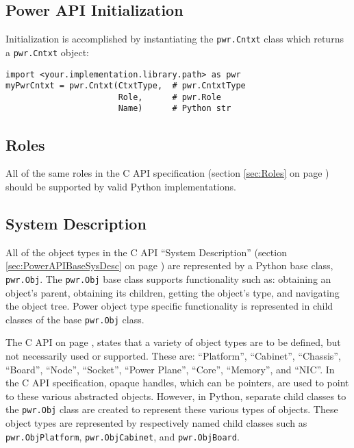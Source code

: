 \documentclass[12pt]{report} %
\begin{document}
\begin{appendices}
\subsection{Power API Initialization}\label{sec:PythonPowerAPIInitialization}
Initialization is accomplished by instantiating the \texttt{pwr.Cntxt} class
which returns a \texttt{pwr.Cntxt} object:

\begin{center}\begin{minipage}{.95\linewidth}\begin{lstlisting}
import <your.implementation.library.path> as pwr
myPwrCntxt = pwr.Cntxt(CtxtType,  # pwr.CntxtType
                       Role,      # pwr.Role
                       Name)      # Python str
\end{lstlisting}\end{minipage}\end{center}

\subsection{Roles}\label{sec:PythonRoles}
All of the same roles in the C API specification (section \ref{sec:Roles} on
page \pageref{sec:Roles}) should be supported by valid Python implementations.

\subsection{System Description}\label{sec:PythonSystemDescription}

All of the object types in the C API ``System Description'' (section
\ref{sec:PowerAPIBaseSysDesc}  on page \pageref{sec:PowerAPIBaseSysDesc}) are
represented by a Python base class, \texttt{pwr.Obj}. The \texttt{pwr.Obj} base
class supports functionality such as: obtaining an object's parent, obtaining
its children, getting the object's type, and navigating the object tree. Power
object type specific functionality is represented in child classes of the base
\texttt{pwr.Obj} class.

The C API on page \pageref{sec:PowerAPIBaseSysDesc}, states that a variety
of object types are to be defined, but not necessarily used or supported. These
are: ``Platform'', ``Cabinet'', ``Chassis'', ``Board'', ``Node'', ``Socket'',
``Power Plane'', ``Core'', ``Memory'', and ``NIC''. In the C API specification,
opaque handles, which can be pointers, are used to point to these various abstracted
objects.  However, in Python, separate child classes to the \texttt{pwr.Obj} class
are created to represent these various types of objects. These object types are
represented by respectively named child classes such as
\texttt{pwr.ObjPlatform}, \texttt{pwr.ObjCabinet}, and \texttt{pwr.ObjBoard}.


\end{appendices}
\end{document}
